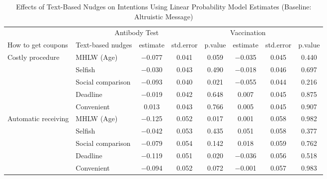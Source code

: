 \begin{table}

\caption{Effects of Text-Based Nudges on Intentions Using Linear Probability Model Estimates (Baseline: Altruistic Message) \label{tab:int-reg-ftest2}}
\centering
\begin{tabular}[t]{>{\raggedright\arraybackslash}p{5em}lcccccc}
\toprule
\multicolumn{2}{c}{ } & \multicolumn{3}{c}{Antibody Test} & \multicolumn{3}{c}{Vaccination} \\
\cmidrule(l{3pt}r{3pt}){3-5} \cmidrule(l{3pt}r{3pt}){6-8}
How to get coupons & Text-based nudges & estimate & std.error & p.value & estimate  & std.error  & p.value \\
\midrule
Costly procedure & MHLW (Age) & \num{-0.077} & \num{0.041} & \num{0.059} & \num{-0.035} & \num{0.045} & \num{0.440}\\
 & Selfish & \num{-0.030} & \num{0.043} & \num{0.490} & \num{-0.018} & \num{0.046} & \num{0.697}\\
 & Social comparison & \num{-0.093} & \num{0.040} & \num{0.021} & \num{-0.055} & \num{0.044} & \num{0.216}\\
 & Deadline & \num{-0.019} & \num{0.042} & \num{0.648} & \num{0.007} & \num{0.045} & \num{0.875}\\
 & Convenient & \num{0.013} & \num{0.043} & \num{0.766} & \num{0.005} & \num{0.045} & \num{0.907}\\
Automatic receiving & MHLW (Age) & \num{-0.125} & \num{0.052} & \num{0.017} & \num{0.001} & \num{0.058} & \num{0.982}\\
 & Selfish & \num{-0.042} & \num{0.053} & \num{0.435} & \num{0.051} & \num{0.058} & \num{0.377}\\
 & Social comparison & \num{-0.079} & \num{0.054} & \num{0.142} & \num{0.018} & \num{0.059} & \num{0.762}\\
 & Deadline & \num{-0.119} & \num{0.051} & \num{0.020} & \num{-0.036} & \num{0.056} & \num{0.518}\\
 & Convenient & \num{-0.094} & \num{0.052} & \num{0.072} & \num{-0.001} & \num{0.057} & \num{0.983}\\
\bottomrule
\end{tabular}
\end{table}
